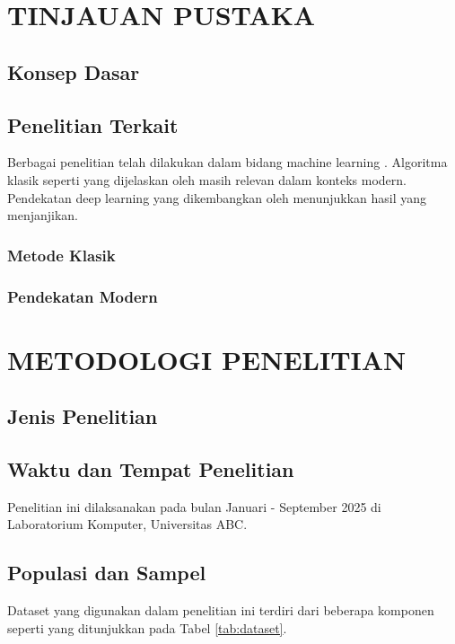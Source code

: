 \documentclass[11pt,a4paper]{article}
\begin{document}
\section{TINJAUAN PUSTAKA}

\subsection{Konsep Dasar}
\lipsum[3]

\subsection{Penelitian Terkait}
Berbagai penelitian telah dilakukan dalam bidang machine learning \cite{smith2023machine}. Algoritma klasik seperti yang dijelaskan oleh \cite{brown2022algorithms} masih relevan dalam konteks modern. Pendekatan deep learning yang dikembangkan oleh \cite{wilson2023deep} menunjukkan hasil yang menjanjikan.

\subsubsection{Metode Klasik}
\lipsum[4]

\subsubsection{Pendekatan Modern}
\lipsum[5]

\section{METODOLOGI PENELITIAN}

\subsection{Jenis Penelitian}
\lipsum[6]

\subsection{Waktu dan Tempat Penelitian}
Penelitian ini dilaksanakan pada bulan Januari - September 2025 di Laboratorium Komputer, Universitas ABC.

\subsection{Populasi dan Sampel}
Dataset yang digunakan dalam penelitian ini terdiri dari beberapa komponen seperti yang ditunjukkan pada Tabel \ref{tab:dataset}.
\end{document}

